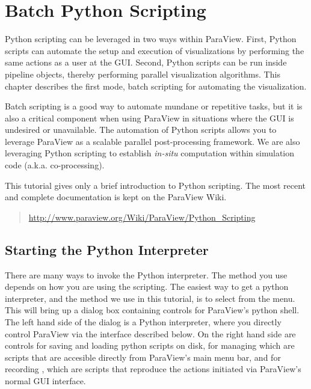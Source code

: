 \chapter{Batch Python Scripting}
\label{chap:BatchPythonScripting}

Python scripting can be leveraged in two ways within ParaView.  First,
Python scripts can automate the setup and execution of visualizations by
performing the same actions as a user at the GUI.  Second, Python scripts
can be run inside pipeline objects, thereby performing parallel
visualization algorithms.  This chapter describes the first mode, batch
scripting for automating the visualization.

Batch scripting is a good way to automate mundane or repetitive tasks, but
it is also a critical component when using ParaView in situations where the
GUI is undesired or unavailable.  The automation of Python scripts allows
you to leverage ParaView as a scalable parallel post-processing framework.
We are also leveraging Python scripting to establish \emph{in-situ}
computation within simulation code (a.k.a. co-processing).

This tutorial gives only a brief introduction to Python scripting.  The
most recent and complete documentation is kept on the ParaView Wiki.

\begin{quote}
  \href{http://www.paraview.org/Wiki/ParaView/Python_Scripting}{http://www.paraview.org/Wiki/ParaView/Python\_Scripting}
\end{quote}

\section{Starting the Python Interpreter}
\label{sec:StartingThePythonInterpreter}

There are many ways to invoke the Python interpreter.  The method you use
depends on how you are using the scripting.  The easiest way to get a
python interpreter, and the method we use in this tutorial, is to select
 \ra {} from the menu.  This will bring up a
dialog box containing controls for ParaView's python shell. The left
hand side of the dialog is a Python interpreter, where you directly control
ParaView via the interface described below. On the right hand side are
controls for saving and loading python scripts on disk, for managing
 which are scripts that are accesible directly from
ParaView's main menu bar, and for recording , which
are scripts that reproduce the actions initiated via ParaView's
normal GUI interface.

